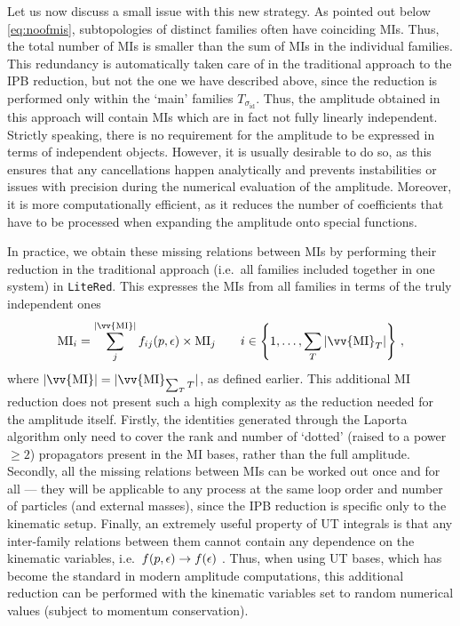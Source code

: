 \documentclass[main.tex]{subfiles}
\begin{document}
Let us now discuss a small issue with this new strategy. As pointed out below \cref{eq:noofmis}, subtopologies of distinct families often have coinciding MIs. Thus, the total number of MIs is smaller than the sum of MIs in the individual families. This redundancy is automatically taken care of in the traditional approach to the IPB reduction, but not the one we have described above, since the reduction is performed only within the `main' families $T_{\sigma_\text{id}}$. Thus, the amplitude obtained in this approach will contain MIs which are in fact not fully linearly independent. Strictly speaking, there is no requirement for the amplitude to be expressed in terms of independent objects. However, it is usually desirable to do so, as this ensures that any cancellations happen analytically and prevents instabilities or issues with precision during the numerical evaluation of the amplitude. Moreover, it is more computationally efficient, as it reduces the number of coefficients that have to be processed when expanding the amplitude onto special functions.

In practice, we obtain these missing relations between MIs by performing their reduction in the traditional approach (i.e.~all families included together in one system) in \texttt{LiteRed}. This expresses the MIs from all families in terms of the truly independent ones 	
\begin{equation}
	\text{MI}_{i} = \sum_j^{|\vv{\text{MI}}|} f_{ij}(p, \eps) \times \text{MI}_j \qquad i \in \left\{1, \ldots, \sum_T |\vv{\text{MI}}_T|\right\}\,,
\end{equation}
where $|\vv{\text{MI}}| = |\vv{\text{MI}}_{\sum_T T}|$, as defined earlier. This additional MI reduction does not present such a high complexity as the reduction needed for the amplitude itself. Firstly, the identities generated through the Laporta algorithm only need to cover the rank and number of `dotted' (raised to a power $\ge2$) propagators present in the MI bases, rather than the full amplitude. Secondly, all the missing relations between MIs can be worked out once and for all --- they will be applicable to any process at the same loop order and number of particles (and external masses), since the IPB reduction is specific only to the kinematic setup. Finally, an extremely useful property of UT integrals is that any inter-family relations between them cannot contain any dependence on the kinematic variables, i.e.~$f(p, \epsilon) \rightarrow f(\epsilon)$ . Thus, when using UT bases, which has become the standard in modern amplitude computations, this additional reduction can be performed with the kinematic variables set to random numerical values (subject to momentum conservation).
\end{document}
